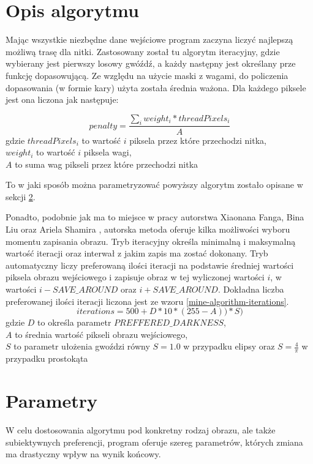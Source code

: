 \documentclass[a4paper, 12pt, polish, twoside]{extreport}
\begin{document}
    \section{Opis algorytmu} \label{mine-algorithm}
    Mając wszystkie niezbędne dane wejściowe program zaczyna liczyć najlepszą możliwą trasę dla nitki. Zastosowany został tu algorytm iteracyjny, gdzie wybierany jest pierwszy losowy gwóźdź, a każdy następny jest określany prze funkcję dopasowującą. Ze względu na użycie maski z wagami, do policzenia dopasowania (w formie kary) użyta została średnia ważona. Dla każdego piksele jest ona liczona jak następuje: 
    
    \begin{equation} \label{mine-algorithm-penalty}
        penalty = \frac{\sum_{i} weight_{i}*threadPixels_{i}}{A}
    \end{equation}
    gdzie \(threadPixels_{i}\) to wartość \(i\) piksela przez które przechodzi nitka, \\
    \(weight_{i}\) to wartość \(i\) piksela  wagi, \\
    \(A\) to suma wag pikseli przez które przechodzi nitka
    
    To w jaki sposób można parametryzować powyższy algorytm zostało opisane w sekcji \ref{mine-param}.
    
    Ponadto, podobnie jak ma to miejsce w pracy autorstwa Xiaonana Fanga, Bina Liu oraz Ariela Shamira \cite{article-string-art-xiaonan}, autorska metoda oferuje kilka możliwości wyboru momentu zapisania obrazu. Tryb iteracyjny określa minimalną i maksymalną wartość iteracji oraz interwał z jakim zapis ma zostać dokonany. Tryb automatyczny liczy preferowaną ilości iteracji na podstawie średniej wartości piksela obrazu wejściowego i zapisuje obraz w tej wyliczonej wartości \(i\), w wartości \(i - SAVE\_AROUND\) oraz \(i + SAVE\_AROUND\). Dokładna liczba preferowanej ilości iteracji liczona jest ze wzoru \ref{mine-algorithm-iterations}. 
    \begin{equation} \label{mine-algorithm-iterations}
        iterations = 500 + D * 10 * (255 - A)) * S)
    \end{equation}
    gdzie \(D\) to określa parametr \(PREFFERED\_DARKNESS\), \\
    \(A\) to średnia wartość pikseli obrazu wejściowego, \\
    \(S\) to parametr ułożenia gwoździ równy \(S = 1.0\) w przypadku elipsy oraz \(S = \frac{4}{\pi}\) w przypadku prostokąta
    
    \newpage
    \section{Parametry} \label{mine-param}
    W celu dostosowania algorytmu pod konkretny rodzaj obrazu, ale także subiektywnych preferencji, program oferuje szereg parametrów, których zmiana ma drastyczny wpływ na wynik końcowy.
    
\end{document}
